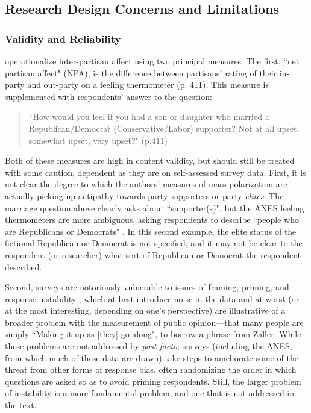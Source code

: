 \documentclass[12pt]{article}
\begin{document}
\subsection{Research Design Concerns and Limitations}

\subsubsection{Validity and Reliability}
\citeauthor{iyengar2012affect} operationalize inter-partisan affect using two principal measures. The first, ``net partisan affect" (NPA), is the difference between partisans' rating of their in-party and out-party on a feeling thermometer (p. 411). This measure is supplemented with respondents' answer to the question: 
\begin{quote}
``How would you feel if you had a son or daughter who married a Republican/Democrat (Conservative/Labor) supporter? Not at all upset, somewhat upset, very upset?" (p.411)
\end{quote}
Both of these measures are high in content validity, but should still be treated with some caution, dependent as they are on self-assessed survey data. First, it is not clear the degree to which the authors' measures of mass polarization are actually picking up antipathy towards party supporters or party \textit{elites}. The marriage question above clearly asks about ``supporter(s)", but the ANES feeling thermometers are more ambiguous, asking respondents to describe ``people who are Republicans or Democrats" \citep[p. 412]{iyengar2012affect}. In this second example, the elite status of the fictional Republican or Democrat is not specified, and it may not be clear to the respondent (or researcher) what sort of Republican or Democrat the respondent described.

Second, surveys are notoriously vulnerable to issues of framing, priming, and response instability \citep[p. 53--75]{zaller1992nature}, which at best introduce noise in the data and at worst (or at the most interesting, depending on one's perspective) are illustrative of a broader problem with the measurement of public opinion---that many people are simply ``Making it up as [they] go along", to borrow a phrase from Zaller. While these problems are not addressed by \citeauthor{iyengar2012affect} \textit{post facto}; surveys (including the ANES, from which much of these data are drawn) take steps to ameliorate some of the threat from other forms of response bias, often randomizing the order in which questions are asked so as to avoid priming respondents. Still, the larger problem of instability is a more fundamental problem, and one that is not addressed in the text.
\end{document}
